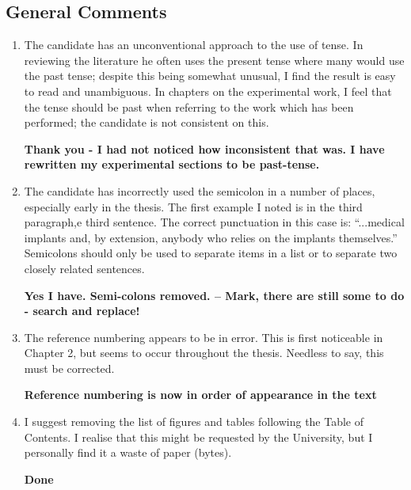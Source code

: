   \subsection*{General Comments}
    \begin{enumerate}
      \item The candidate has an unconventional approach to the use of tense. In reviewing the literature he often uses the present tense where many would use the past tense; despite this being somewhat unusual, I find the result is easy to read and unambiguous. In chapters on the experimental work, I feel that the tense should be past when referring to the work which has been performed; the candidate is not consistent on this.

      \textbf{\textcolor{OliveGreen}{
        Thank you - I had not noticed how inconsistent that was. I have rewritten my experimental sections to be past-tense.
      }}

      \item The candidate has incorrectly used the semicolon in a number of places, especially early in the thesis. The first example I noted is in the third paragraph,e third sentence. The correct punctuation in this case is: ``...medical implants and, by extension, anybody who relies on the implants themselves.'' Semicolons should only be used to separate items in a list or to separate two closely related sentences.

      \textbf{\textcolor{OliveGreen}{
        Yes I have. Semi-colons removed. -- Mark, there are still some to do - search and replace!
      }}

      \item The reference numbering appears to be in error. This is first noticeable in Chapter 2, but seems to occur throughout the thesis. Needless to say, this must be corrected.

      \textbf{\textcolor{OliveGreen}{
        Reference numbering is now in order of appearance in the text
      }}

      \item I suggest removing the list of figures and tables following the Table of Contents. I realise that this might be requested by the University, but I personally find it a waste of paper (bytes).

      \textbf{\textcolor{OliveGreen}{
        Done
      }}

    \end{enumerate}
